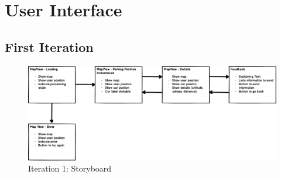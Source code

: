 \chapter{User Interface}
\label{appendix:userInterface}

\section{First Iteration}
\begin{figure}[H]
    \centering
    \includegraphics[width=\textwidth]{images/UI/Iteration1-Overview.png}
    \caption{Iteration 1: Storyboard}
    \label{fig:i1story}
\end{figure}


